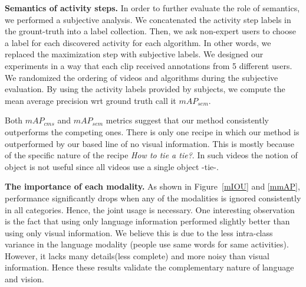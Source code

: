 \vspace{1mm}
\noindent\textbf{Semantics of activity steps.}
In order to further evaluate the role of semantics, we performed a subjective analysis. We concatenated the activity step labels in the grount-truth into a label collection. Then, we ask non-expert users to choose a label for each discovered activity for each algorithm. In other words, we replaced the maximization step with subjective labels. We designed our experiments in a way that each clip received annotations from 5 different users. We randomized the ordering of videos and algorithms during the subjective evaluation. By using the activity labels provided by subjects, we compute the mean average precision wrt ground truth call it $mAP_{sem}$.

\begin{table}
\caption{Semantic mean-average-precision $mAP_{sem}$.}
{\small
{}}
\normalsize
\vspace{-8mm}
\end{table}

Both $mAP_{cms}$ and $mAP_{sem}$ metrics suggest that our method consistently outperforms the competing ones. There is only one recipe in which our method is outperformed by our based line of no visual information. This is mostly because of the specific nature of the recipe \emph{How to tie a tie?}. In such videos the notion of object is not useful since all videos use a single object -tie-.

\vspace{1mm}
\noindent\textbf{The importance of each modality.}
As shown in Figure~\ref{mIOU} and \ref{mmAP}, performance significantly drops when any of the modalities is ignored consistently in all categories. Hence, the joint usage is necessary. One interesting observation is the fact that using only language information performed slightly better than using only visual information. We believe this is due to the less intra-class variance in the language modality (\ie people use same words for same activities). However, it lacks many details(less complete) and more noisy than visual information. Hence these results validate the complementary nature of language and vision.

